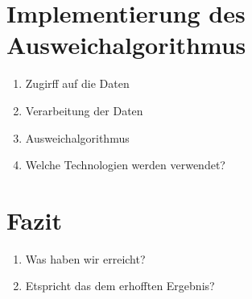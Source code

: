 \documentclass[12pt]{article}
\begin{document}
\section{Implementierung des Ausweichalgorithmus}

\begin{enumerate}
    \item Zugirff auf die Daten\\
    \item Verarbeitung der Daten\\
    \item Ausweichalgorithmus\\
    \item Welche Technologien werden verwendet?\\
\end{enumerate}


\section{Fazit}
\begin{enumerate}
    \item Was haben wir erreicht?\\
    \item Etspricht das dem erhofften Ergebnis?\\
\end{enumerate}
\end{document}
